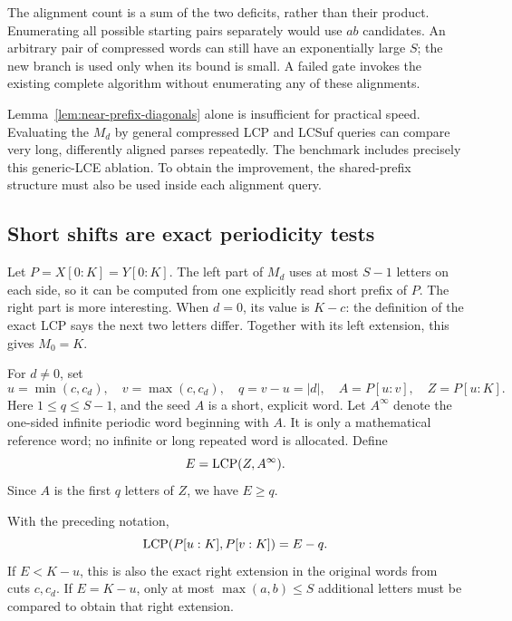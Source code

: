 The alignment count is a sum of the two deficits, rather than their
product. Enumerating all possible starting pairs separately would use
$ab$ candidates. An arbitrary pair of compressed words can still have an
exponentially large $S$; the new branch is used only when its bound is
small. A failed gate invokes the existing complete algorithm without
enumerating any of these alignments.

Lemma~\ref{lem:near-prefix-diagonals} alone is insufficient for practical
speed. Evaluating the $M_d$ by general compressed LCP and LCSuf queries
can compare very long, differently aligned parses repeatedly. The
benchmark includes precisely this generic-LCE ablation. To obtain the
improvement, the shared-prefix structure must also be used inside each
alignment query.

\subsection{Short shifts are exact periodicity tests}

Let $P=X[0:K]=Y[0:K]$. The left part of $M_d$ uses at most $S-1$ letters
on each side, so it can be computed from one explicitly read short prefix
of $P$. The right part is more interesting. When $d=0$, its value is
$K-c$: the definition of the exact LCP says the next two letters differ.
Together with its left extension, this gives $M_0=K$.

For $d\ne0$, set
\[
 u=\min(c,c_d),\quad v=\max(c,c_d),\quad q=v-u=|d|,
 \quad A=P[u:v],\quad Z=P[u:K].
\]
Here $1\le q\le S-1$, and the seed $A$ is a short, explicit word. Let
$A^\infty$ denote the one-sided infinite periodic word beginning with $A$.
It is only a mathematical reference word; no infinite or long repeated
word is allocated. Define
\[
 E=\operatorname{LCP}(Z,A^\infty).
\]
Since $A$ is the first $q$ letters of $Z$, we have $E\ge q$.

\begin{lemma}
\label{lem:near-prefix-periodicity}
With the preceding notation,
\[
 \operatorname{LCP}(P[u:K],P[v:K])=E-q.
\]
If $E<K-u$, this is also the exact right extension in the original words
from cuts $c,c_d$. If $E=K-u$, only at most $\max(a,b)\le S$ additional
letters must be compared to obtain that right extension.
\end{lemma}

